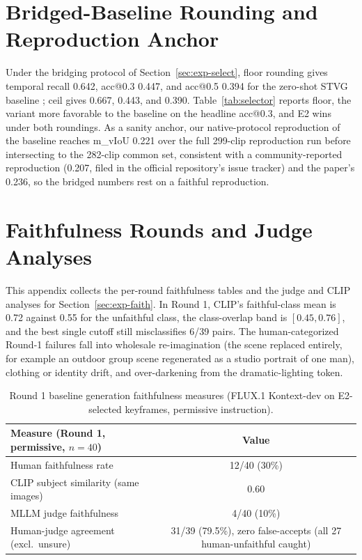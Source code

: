 \documentclass[10pt]{article}
\begin{document}
\section{Bridged-Baseline Rounding and Reproduction Anchor}\label{app:bridge}

Under the bridging protocol of Section~\ref{sec:exp-select}, floor rounding gives temporal recall 0.642, acc@0.3 0.447, and acc@0.5 0.394 for the zero-shot STVG baseline \citep{zeroshotstvg2509}; ceil gives 0.667, 0.443, and 0.390. Table~\ref{tab:selector} reports floor, the variant more favorable to the baseline on the headline acc@0.3, and E2 wins under both roundings. As a sanity anchor, our native-protocol reproduction of the baseline reaches m\_vIoU 0.221 over the full 299-clip reproduction run before intersecting to the 282-clip common set, consistent with a community-reported reproduction (0.207, filed in the official repository's issue tracker) and the paper's 0.236, so the bridged numbers rest on a faithful reproduction.

\section{Faithfulness Rounds and Judge Analyses}\label{app:judge}

This appendix collects the per-round faithfulness tables and the judge and CLIP analyses for Section~\ref{sec:exp-faith}. In Round 1, CLIP's faithful-class mean is 0.72 against 0.55 for the unfaithful class, the class-overlap band is $[0.45, 0.76]$, and the best single cutoff still misclassifies 6/39 pairs. The human-categorized Round-1 failures fall into wholesale re-imagination (the scene replaced entirely, for example an outdoor group scene regenerated as a studio portrait of one man), clothing or identity drift, and over-darkening from the dramatic-lighting token.

\begin{table}[htbp]
\centering
\small
\begin{tabular}{lc}
\toprule
Measure (Round 1, permissive, $n=40$) & Value \\
\midrule
Human faithfulness rate & 12/40 (30\%) \\
CLIP subject similarity (same images) & 0.60 \\
MLLM judge faithfulness & 4/40 (10\%) \\
Human-judge agreement (excl.\ unsure) & 31/39 (79.5\%), zero false-accepts (all 27 human-unfaithful caught) \\
\bottomrule
\end{tabular}
\caption{Round 1 baseline generation faithfulness measures (FLUX.1 Kontext-dev on E2-selected keyframes, permissive instruction).}
\label{tab:round1}
\end{table}
\end{document}
